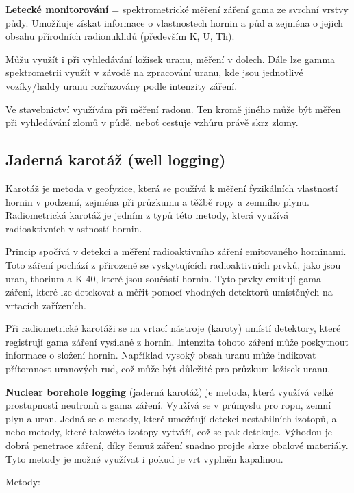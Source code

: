 \textbf{Letecké monitorování} = spektrometrické měření záření gama ze svrchní vrstvy půdy. Umožňuje získat informace o vlastnostech hornin a půd a zejména o jejich obsahu přírodních radionuklidů (především K, U, Th).

Můžu využít i při vyhledávání ložisek uranu, měření v dolech. Dále lze gamma spektrometrii využít v závodě na zpracování uranu, kde jsou jednotlivé vozíky/haldy uranu rozřazovány podle intenzity záření.

Ve stavebnictví využívám při měření radonu. Ten kromě jiného může být měřen při vyhledávání zlomů v půdě, neboť cestuje vzhůru právě skrz zlomy.

\subsection{Jaderná karotáž (well logging)}

Karotáž je metoda v geofyzice, která se používá k měření fyzikálních vlastností hornin v podzemí, zejména při průzkumu a těžbě ropy a zemního plynu. Radiometrická karotáž je jedním z typů této metody, která využívá radioaktivních vlastností hornin.

Princip spočívá v detekci a měření radioaktivního záření emitovaného horninami. Toto záření pochází z přirozeně se vyskytujících radioaktivních prvků, jako jsou uran, thorium a K-40, které jsou součástí hornin. Tyto prvky emitují gama záření, které lze detekovat a měřit pomocí vhodných detektorů umístěných na vrtacích zařízeních.

Při radiometrické karotáži se na vrtací nástroje (karoty) umístí detektory, které registrují gama záření vysílané z hornin. Intenzita tohoto záření může poskytnout informace o složení hornin. Například vysoký obsah uranu může indikovat přítomnost uranových rud, což může být důležité pro průzkum ložisek uranu.

\textbf{Nuclear borehole logging} (jaderná karotáž) je metoda, která využívá velké prostupnosti neutronů a gama záření. Využívá se v průmyslu pro ropu, zemní plyn a uran. Jedná se o metody, které umožňují detekci nestabilních izotopů, a nebo metody, které takovéto izotopy vytváří, což se pak detekuje. Výhodou je dobrá penetrace záření, díky čemuž záření snadno projde skrze obalové materiály. Tyto metody je možné využívat i pokud je vrt vyplněn kapalinou. 

Metody:

